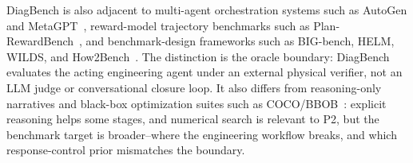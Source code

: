 DiagBench is also adjacent to multi-agent orchestration systems such as AutoGen and MetaGPT~\citep{wu2023autogen,hong2024metagpt}, reward-model trajectory benchmarks such as Plan-RewardBench~\citep{wang2026planrewardbench}, and benchmark-design frameworks such as BIG-bench, HELM, WILDS, and How2Bench~\citep{srivastava2022bigbench,liang2023helm,koh2021wilds,cao2025how2bench}. The distinction is the oracle boundary: DiagBench evaluates the acting engineering agent under an external physical verifier, not an LLM judge or conversational closure loop. It also differs from reasoning-only narratives and black-box optimization suites such as COCO/BBOB~\citep{hansen2021coco}: explicit reasoning helps some stages, and numerical search is relevant to P2, but the benchmark target is broader--where the engineering workflow breaks, and which response-control prior mismatches the boundary.
